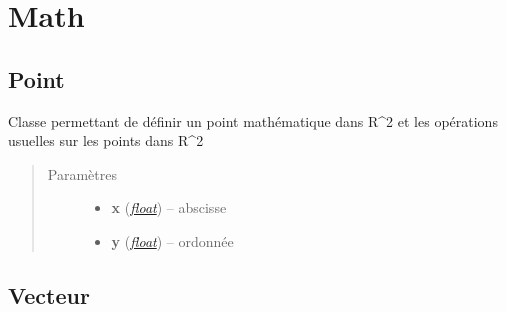 \documentclass[letterpaper,10pt,french]{sphinxmanual}
\begin{document}
\chapter{Math}
\label{math::doc}\label{math:math}

\section{Point}
\label{math:point}\label{math:module-lib.math.point}

\begin{fulllineitems}
\label{math:lib.math.point.Point}
Classe permettant de définir un point mathématique dans R\textasciicircum{}2 et les opérations usuelles sur les points dans R\textasciicircum{}2
\begin{quote}\begin{description}
\item[{Paramètres}] \leavevmode\begin{itemize}
\item {} 
\textbf{x} (\href{http://docs.python.org/library/functions.html\#float}{\emph{float}}) -- abscisse

\item {} 
\textbf{y} (\href{http://docs.python.org/library/functions.html\#float}{\emph{float}}) -- ordonnée

\end{itemize}

\end{description}\end{quote}

\end{fulllineitems}



\section{Vecteur}
\label{math:module-lib.math.vecteur}\label{math:vecteur}
\end{document}
